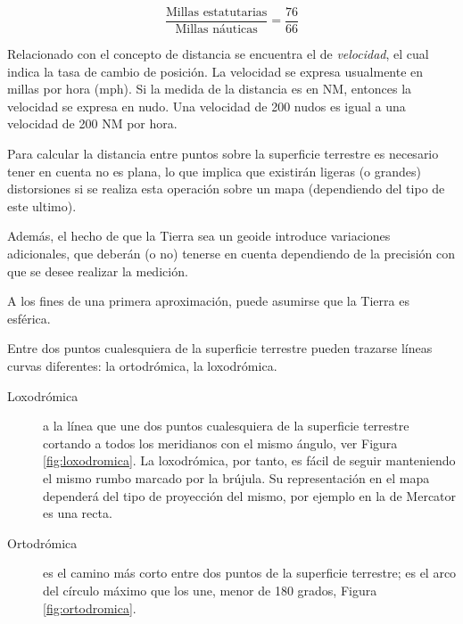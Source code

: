 \[\displaystyle
	\frac{\text{Millas estatutarias}}{\text{Millas n\'auticas}} 
	= \frac{76}{66}
\]

 Relacionado con el concepto de distancia se encuentra el de \emph{velocidad}, el cual indica la tasa de cambio de posici\'on. La velocidad se expresa usualmente en millas por hora (mph). Si la medida de la distancia es en NM, entonces la velocidad se expresa en \gls{nudo}. Una velocidad de 200 nudos es igual a una velocidad de 200 NM por hora.

Para calcular la distancia entre puntos sobre la superficie terrestre es necesario tener en cuenta no es plana, lo que implica que existir\'an ligeras (o grandes) distorsiones si se realiza esta operaci\'on sobre un mapa (dependiendo del tipo de este ultimo).
  
Adem\'as, el hecho de que la Tierra sea un geoide introduce variaciones
adicionales, que deber\'an  (o no) tenerse en cuenta dependiendo de la precisi\'on con que se desee realizar la medici\'on. 

A los fines de una primera aproximaci\'on, puede asumirse que la Tierra es esf\'erica.

Entre dos puntos cualesquiera de la superficie terrestre pueden trazarse líneas curvas diferentes: la ortodrómica, la loxodrómica. %

\begin{description}
\item[Loxodr\'omica \label{loxodromica}] %
  a la línea que une dos puntos cualesquiera de la
  superficie terrestre cortando a todos los meridianos con el mismo
  ángulo, ver Figura \ref{fig:loxodromica}. La loxodrómica, por tanto, es fácil de seguir manteniendo el
  mismo rumbo marcado por la brújula. Su representación en el mapa
  dependerá del tipo de proyección del mismo, por ejemplo en la de
  Mercator es una recta.

\item[Ortodrómica \label{ortodromica}] %
	es el camino más corto entre dos puntos de la superficie terrestre; es el arco del círculo máximo que los une, menor de 180 grados, Figura \ref{fig:ortodromica}. 


\end{description}

